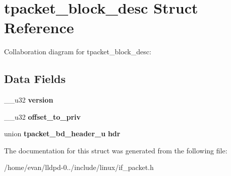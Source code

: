 \section{tpacket\-\_\-block\-\_\-desc \-Struct \-Reference}
\label{structtpacket__block__desc}


\-Collaboration diagram for tpacket\-\_\-block\-\_\-desc\-:
\subsection*{\-Data \-Fields}
\begin{DoxyCompactItemize}
\item 
\-\_\-\-\_\-u32 {\bfseries version}\label{structtpacket__block__desc_a1c857bd0b02d104bdd57a95e6bbcd9f9}

\item 
\-\_\-\-\_\-u32 {\bfseries offset\-\_\-to\-\_\-priv}\label{structtpacket__block__desc_af3ca2783ec7175d8af2a0789007f1785}

\item 
union {\bf tpacket\-\_\-bd\-\_\-header\-\_\-u} {\bfseries hdr}\label{structtpacket__block__desc_ae92e379fc13a0e74d7f49e9c8c6330c9}

\end{DoxyCompactItemize}


\-The documentation for this struct was generated from the following file\-:\begin{DoxyCompactItemize}
\item 
/home/evan/lldpd-\/0../include/linux/if\-\_\-packet.\-h\end{DoxyCompactItemize}
